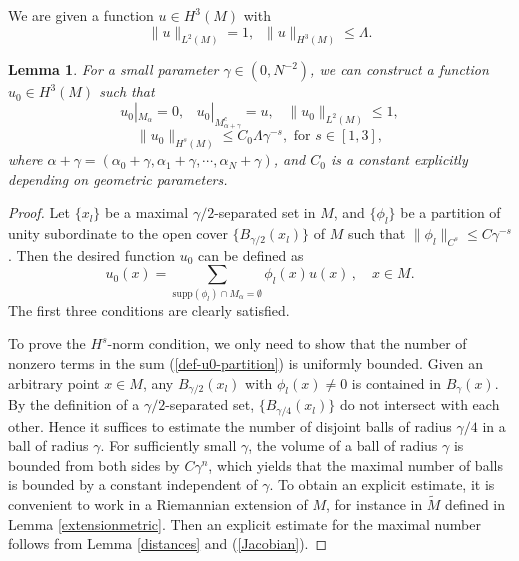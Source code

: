 \documentclass[11pt,letterpaper]{amsart}
\numberwithin{equation}{section}
\theoremstyle{definition}
\theoremstyle{plain}
\theoremstyle{definition}
\theoremstyle{plain}
\newtheorem{u0}{Lemma}[section]
\theoremstyle{definition}
\theoremstyle{plain}
\begin{document}
\smallskip
We are given a function $u\in H^3(M)$ with
\begin{equation*}\label{aprior}
\|u\|_{L^2(M)}=1,\;\;\|u\|_{H^3(M)}\leqslant \Lambda.
\end{equation*}

\begin{u0}\label{def-u0}
For a small parameter $\gamma\in (0,N^{-2})$, we can construct a function $u_0\in H^3(M)$ such that
$$u_0 |_{M_{\alpha}}=0, \;\;\; u_0 |_{M^c_{\alpha+\gamma}}=u, \;\;\; \|u_0\|_{L^2(M)}\leqslant 1,$$
\begin{equation}\label{Hnorm}
\|u_0\|_{H^s(M)}\leqslant C_0 \Lambda \gamma^{-s}, \textrm{ for }s\in [1,3],
\end{equation}
where $\alpha+\gamma=(\alpha_0+\gamma,\alpha_1+\gamma,\cdots,\alpha_N+\gamma)$, and $C_0$ is a constant explicitly depending on geometric parameters. 
\end{u0}
\begin{proof}
Let $\{x_l\}$ be a maximal $\gamma/2$-separated set in $M$, and $\{\phi_l\}$ be a partition of unity subordinate to the open cover $\{B_{\gamma/2}(x_l)\}$ of $M$ such that $\|\phi_l\|_{C^s}\leqslant C \gamma^{-s}$. Then the desired function $u_0$ can be defined as
\begin{equation}\label{def-u0-partition}
u_0(x)=\sum_{\textrm{supp}(\phi_l)\cap M_{\alpha}=\emptyset} \phi_l(x) u(x)\, ,\quad x\in M.
\end{equation}
The first three conditions are clearly satisfied. 

To prove the $H^s$-norm condition, we only need to show that the number of nonzero terms in the sum (\ref{def-u0-partition}) is uniformly bounded. Given an arbitrary point $x\in M$, any $B_{\gamma/2}(x_l)$ with $\phi_l(x)\neq 0$ is contained in $B_{\gamma}(x)$. By the definition of a $\gamma/2$-separated set, $\{B_{\gamma/4}(x_l)\}$ do not intersect with each other. Hence it suffices to estimate the number of disjoint balls of radius $\gamma/4$ in a ball of radius $\gamma$. For sufficiently small $\gamma$, the volume of a ball of radius $\gamma$ is bounded from both sides by $C\gamma^n$, which yields that the maximal number of balls is bounded by a constant independent of $\gamma$. To obtain an explicit estimate, it is convenient to work in a Riemannian extension of $M$, for instance in $\widetilde{M}$ defined in Lemma \ref{extensionmetric}. Then an explicit estimate for the maximal number follows from Lemma \ref{distances} and (\ref{Jacobian}).
\end{proof}
\end{document}
